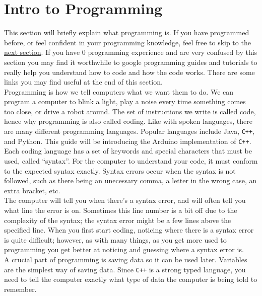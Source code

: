 \documentclass[../TinyBot.tex]{subfiles}
\begin{document}
\section{Intro to Programming}

This section will briefly explain what programming is. If you have programmed before, or feel
confident in your programming knowledge, feel free to skip to the \href{sec:introarduino}{next section}.
If you have 0 programming experience and are very confused by this section you may find it
worthwhile to google programming guides and tutorials to really help you understand how to
code and how the code works. There are some links you may find useful at the end of this section. \\

Programming is how we tell computers what we want them to do. We can program a computer to blink a
light, play a noise every time something comes too close, or drive a robot around. The set of
instructions we write is called code, hence why programming is also called coding. Like with spoken
languages, there are many different programming languages. Popular languages include Java, \lstinline[]!C++!,
and Python. This guide will be introducing the Arduino implementation of \lstinline[]!C++!. \\

Each coding language has a set of keywords and special characters that must be used, called ``syntax''.
For the computer to understand your code, it must conform to the expected syntax exactly.
Syntax errors occur when the syntax is not followed, such as there being an unecessary comma,
a letter in the wrong case, an extra bracket, etc. \\

The computer will tell you when there's a syntax error, and will often tell you what line
the error is on. Sometimes this line number is a bit off due to the complexity of the syntax;
the syntax error might be a few lines above the specified line. When you first start coding,
noticing where there is a syntax error is quite difficult; however, as with many things,
as you get more used to programming you get better at noticing and guessing where a syntax error is. \\ 

A crucial part of programming is saving data so it can be used later. Variables are the simplest way
of saving data. Since \lstinline[]!C++! is a strong typed language, you need to tell the computer exactly what type
of data the computer is being told to remember.\\
\end{document}
